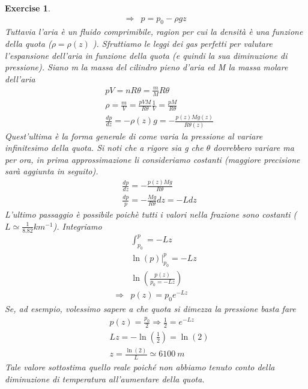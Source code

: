 \documentclass[10pt,a4paper]{article}
\newtheorem{exercise}{Exercise}
\begin{document}
\begin{exercise}
\begin{align*}
	\Rightarrow & p = p_0 - \rho g z
\end{align*} 
Tuttavia l'aria è un fluido comprimibile, ragion per cui la densità è una funzione della quota ($\rho = \rho(z)$ ). Sfruttiamo le leggi dei gas perfetti per valutare l'espansione dell'aria in funzione della quota (e quindi la sua diminuzione di pressione). Siano m la massa del cilindro pieno d'aria ed M la massa molare dell'aria
\begin{align*} 
	&p V = n R \theta = \frac{m}{M} R \theta \\
	&\rho = \frac{m}{V} = \frac{p V M}{R \theta} \frac{1}{V} = \frac{p M}{R \theta}\\
	&\frac{dp}{dz}=-\rho(z) g = - \frac{p(z) M g(z)}{R\theta(z)}
\end{align*} 
Quest'ultima è la forma generale di come varia la pressione al variare infinitesimo della quota. Si noti che a rigore sia g che $\theta$ dovrebbero variare ma per ora, in prima approssimazione li consideriamo costanti (maggiore precisione sarà aggiunta in seguito). 
\begin{align}\label{eq:esercizio_pressione}
	&\frac{dp}{dz}=- \frac{p(z) M g}{R\theta}\nonumber\\
	&\frac{dp}{p} = -\frac{M g}{R \theta} dz = - L dz
\end{align} 
L'ultimo passaggio è possibile poichè tutti i valori nella frazione sono costanti ($ L \simeq \frac{1}{8.82} km^{-1}$). Integriamo
\begin{align*} 
	&\int_{p_0}^{p} = -L z\\
	& \ln(p) \Big|_{p_0}^p = -L z\\
	&\ln\left(\frac{p(z)}{p_0= - L z}\right)\\
	\Rightarrow& p(z) = p_0 e^{-L z}
\end{align*} 
Se, ad esempio, volessimo sapere a che quota si dimezza la pressione basta fare
\begin{align*} 
	&p(z) = \frac{p_0}{2} \Rightarrow \frac{1}{2} = e^{-L z}\\
	&L z = -\ln(\frac{1}{2}) = \ln(2) \\
	&z = \frac{\ln(2)}{L} \simeq 6100\ m
\end{align*} 
Tale valore sottostima quello reale poiché non abbiamo tenuto conto della diminuzione di temperatura all'aumentare della quota.
\end{exercise}
\end{document}
